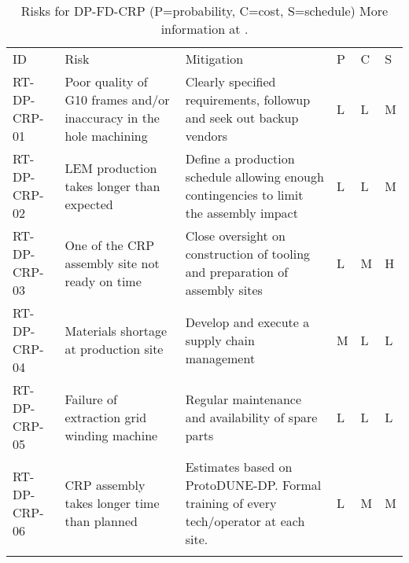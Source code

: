 
\begin{footnotesize}
\begin{longtable}{x{0.18\textwidth}x{0.20\textwidth}x{0.32\textwidth}x{0.02\textwidth}x{0.02\textwidth}x{0.02\textwidth}} 
\caption[Risks for DP-FD-CRP]{Risks for DP-FD-CRP (P=probability, C=cost, S=schedule) More information at . } \\
ID & Risk & Mitigation & P & C & S  \\  \colhline
RT-DP-CRP-01 & Poor quality of G10  frames and/or inaccuracy in the hole machining & Clearly specified requirements, followup and seek out backup vendors & L & L  & M \\  \colhline
RT-DP-CRP-02 & LEM production takes longer than expected & Define a production schedule allowing enough contingencies to limit the assembly impact   & L & L  & M \\  \colhline
RT-DP-CRP-03 & One of the CRP assembly site not ready on time & Close oversight on construction of tooling and preparation of assembly sites & L & M & H  \\  \colhline
RT-DP-CRP-04 & Materials shortage at production site & Develop and execute a supply chain management & M & L  & L \\  \colhline
RT-DP-CRP-05 & Failure of extraction grid winding machine & Regular maintenance and availability of spare parts & L & L  & L \\  \colhline
RT-DP-CRP-06 & CRP assembly takes longer time than planned & Estimates based on ProtoDUNE-DP. Formal training of every tech/operator at each site. & L & M & M \\  \colhline

\label{tab:risks:DP-FD-CRP}
\end{longtable}
\end{footnotesize}